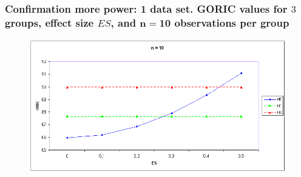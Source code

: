 \documentclass[10pt]{beamer}\usepackage[]{graphicx}\usepackage[]{xcolor}
\begin{document}
%
\begin{frame}
\frametitle{Confirmation more power: 1 data set. GORIC values for $3$ groups, effect size $ES$, and $\mathbf{n=10}$ observations per group}
%
%
\begin{figure}
    \centering
  \includegraphics[scale = 0.54]{ORICvsAIC_n10.png}\\
\end{figure}

\end{frame}
\end{document}
